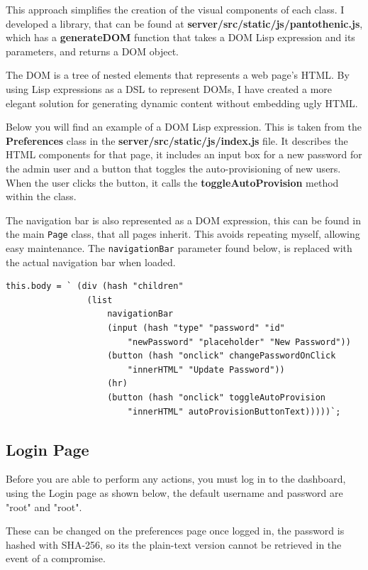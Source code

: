 This approach simplifies the creation of the visual components of each class.
I developed a library, that can be found at \textbf{server/src/static/js/pantothenic.js},
which has a \textbf{generateDOM} function that takes a
DOM Lisp expression and its parameters, and returns a DOM object.

The DOM is a tree of nested elements that represents a web page's HTML.
By using Lisp expressions as a DSL to represent DOMs,
I have created a more elegant solution for generating dynamic
content without embedding ugly HTML.

Below you will find an example of a DOM Lisp expression.
This is taken from the \textbf{Preferences} class in the
\textbf{server/src/static/js/index.js} file.
It describes the HTML components for that page,
it includes an input box for a new password for the admin user
and a button that toggles the auto-provisioning of new users.
When the user clicks the button, it calls the
\textbf{toggleAutoProvision} method within the class.

The navigation bar is also represented as a DOM expression,
this can be found in the main \texttt{Page} class,
that all pages inherit.
This avoids repeating myself, allowing easy maintenance.
The \texttt{navigationBar} parameter found below,
is replaced with the actual navigation bar when loaded.

\begin{lstlisting}
this.body = ` (div (hash "children"
                (list
                    navigationBar
                    (input (hash "type" "password" "id"
                        "newPassword" "placeholder" "New Password"))
                    (button (hash "onclick" changePasswordOnClick
                        "innerHTML" "Update Password"))
                    (hr)
                    (button (hash "onclick" toggleAutoProvision
                        "innerHTML" autoProvisionButtonText)))))`;
\end{lstlisting}

\subsection{Login Page}
Before you are able to perform any actions,
you must log in to the dashboard,
using the Login page as shown below,
the default username and password are "root" and "root".

These can be changed on the preferences page once logged in,
the password is hashed with SHA-256, so its
the plain-text version cannot be retrieved in the event of a compromise.

